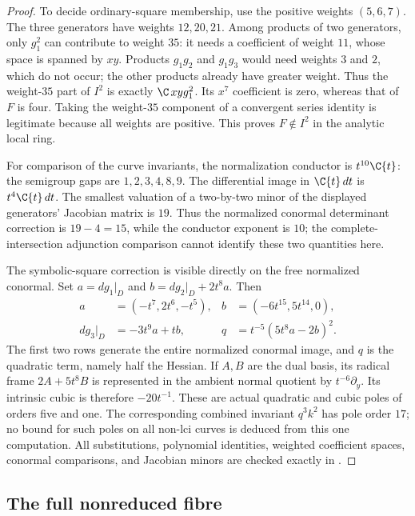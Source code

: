\begin{proof}
To decide ordinary-square membership, use the positive weights
$(5,6,7)$. The three generators have weights $12,20,21$.
Among products of two generators, only $g_1^2$ can contribute
to weight $35$: it needs a coefficient of weight $11$, whose
space is spanned by $xy$. Products $g_1g_2$ and $g_1g_3$ would
need weights $3$ and $2$, which do not occur; the other products
already have greater weight. Thus the weight-$35$ part of $I^2$
is exactly $\C\,xyg_1^2$. Its $x^7$ coefficient is zero, whereas
that of $F$ is four. Taking the weight-$35$ component of a
convergent series identity is legitimate because all weights are
positive. This proves $F\notin I^2$ in the analytic local ring.

For comparison of the curve invariants, the normalization conductor
is $t^{10}\C\{t\}$: the semigroup gaps are $1,2,3,4,8,9$.
The differential image in $\C\{t\}\,dt$ is $t^4\C\{t\}\,dt$.
The smallest valuation of a two-by-two minor of the displayed
generators' Jacobian matrix is $19$. Thus the normalized conormal
determinant correction is $19-4=15$, while the conductor exponent
is $10$; the complete-intersection adjunction comparison cannot
identify these two quantities here.

The symbolic-square correction is visible directly on the free
normalized conormal. Set $a=dg_1|_D$ and
$b=dg_2|_D+2t^8a$. Then
\[
 \begin{aligned}
 a&=(-t^7,2t^6,-t^5),& b&=(-6t^{15},5t^{14},0),\\
 dg_3|_D&=-3t^9a+tb,&
 q&=t^{-5}(5t^8a-2b)^2.
 \end{aligned}                                                   \tag{A.NL.5}
\]
The first two rows generate the entire normalized conormal image,
and $q$ is the quadratic term, namely half the Hessian.
If $A,B$ are the dual basis, its radical frame $2A+5t^8B$
is represented in the ambient normal quotient by $t^{-6}\partial_y$.
Its intrinsic cubic is therefore $-20t^{-1}$. These are actual
quadratic and cubic poles of orders five and one. The corresponding
combined invariant $q^3k^2$ has pole order $17$; no bound for such
poles on all non-lci curves is deduced from this one computation.
All substitutions, polynomial identities, weighted coefficient
spaces, conormal comparisons, and Jacobian minors are checked
exactly in .
\end{proof}

\subsection{The full nonreduced fibre}

